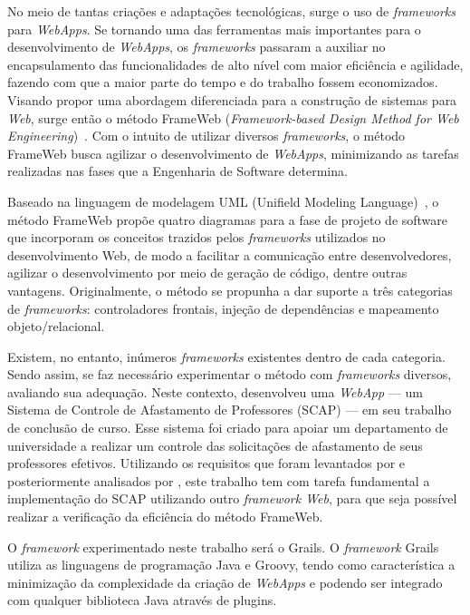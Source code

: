 No meio de tantas criações e adaptações tecnológicas, surge o uso de \textit{frameworks} para \textit{WebApps}. Se tornando uma das ferramentas mais importantes para o desenvolvimento de \textit{WebApps}, os \textit{frameworks} passaram a auxiliar no encapsulamento das funcionalidades de alto nível com maior eficiência e agilidade, fazendo com que a maior parte do tempo e do trabalho fossem economizados. Visando propor uma abordagem diferenciada para a construção de sistemas para \textit{Web}, surge então o método FrameWeb (\textit{Framework-based Design Method for Web Engineering})~\cite{souza:masterthesis07}. Com o intuito de utilizar diversos \textit{frameworks}, o método FrameWeb busca agilizar o desenvolvimento de \textit{WebApps}, minimizando as tarefas realizadas nas fases que a Engenharia de Software determina.

Baseado na linguagem de modelagem UML (Unifield Modeling Language)~\cite{booch-et-al:u06}, o método FrameWeb propõe quatro diagramas para a fase de projeto de software que incorporam os conceitos trazidos pelos \textit{frameworks} utilizados no desenvolvimento Web, de modo a facilitar a comunicação entre desenvolvedores, agilizar o desenvolvimento por meio de geração de código, dentre outras vantagens. Originalmente, o método se propunha a dar suporte a três categorias de \textit{frameworks}: controladores frontais, injeção de dependências e mapeamento objeto/relacional.

Existem, no entanto, inúmeros \textit{frameworks} existentes dentro de cada categoria. Sendo assim, se faz necessário experimentar o método com \textit{frameworks} diversos, avaliando sua adequação. Neste contexto,  desenvolveu uma \textit{WebApp} --- um Sistema de Controle de Afastamento de Professores (SCAP) --- em seu trabalho de conclusão de curso. Esse sistema foi criado para apoiar um departamento de universidade a realizar um controle das solicitações de afastamento de seus professores efetivos. Utilizando os requisitos que foram levantados por  e posteriormente analisados por , este trabalho tem com tarefa fundamental a implementação do SCAP utilizando outro \textit{framework Web}, para que seja possível realizar a verificação da eficiência do método FrameWeb.

O \textit{framework} experimentado neste trabalho será o Grails. O \textit{framework} Grails utiliza as linguagens de programação Java e Groovy, tendo como característica a minimização da complexidade da criação de \textit{WebApps} e podendo ser integrado com qualquer biblioteca Java através de plugins.

